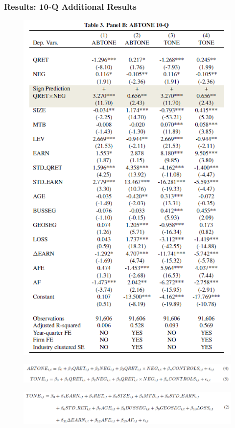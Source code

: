 \documentclass{beamer}
\begin{document}
\begin{frame}
\frametitle{Results: 10-Q Additional Results}
\begin{multicols}{2}
	\begin{figure}[h]
	\centering
	\includegraphics[width=0.79\linewidth]{tab3panB}
	\label{tab3panB}
	\end{figure}

	\begin{figure}[h]
	\centering
	\includegraphics[width=1.05\linewidth]{tab3panBeq}
	\label{tab3panBeq}
	\end{figure}

	\begin{figure}[h]
	\centering
	\includegraphics[width=1.05\linewidth]{eq2}
	\label{eq2}
	\end{figure}


\end{multicols}
\end{frame}
\end{document}
